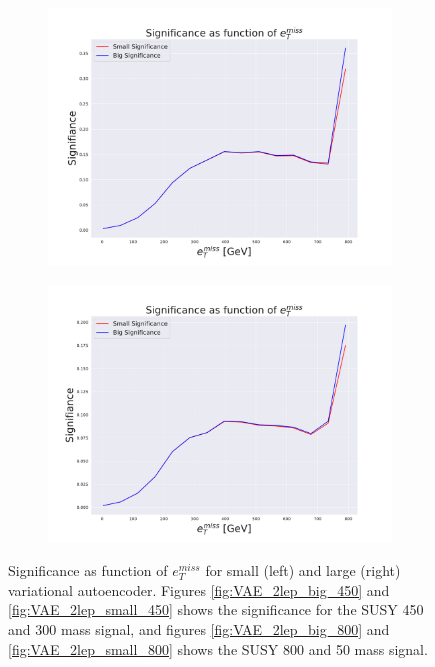 \begin{figure}[H]
\begin{subfigure}{.45\textwidth}
        \includegraphics[width=\textwidth]{Figures/VAE_testing/big/2lep/significance_etmiss_800p0p050.pdf}
        \caption{}
        \label{fig:VAE_2lep_big_800_signi}
    \end{subfigure}
    \hfill   
    \begin{subfigure}{.45\textwidth}
        \includegraphics[width=\textwidth]{Figures/VAE_testing/small/2lep/significance_etmiss_800p0p050.pdf}
        \caption{}
        \label{fig:VAE_2lep_small_800_signi}
    \end{subfigure}
    \hfill      
    \caption[VAE | Significance as function of $e_T^{miss}$]{Significance as function of $e_T^{miss}$ for small (left) and large (right) 
    variational autoencoder. Figures \ref{fig:VAE_2lep_big_450} and \ref{fig:VAE_2lep_small_450} shows the significance for the SUSY 450 
    and 300 mass signal, and figures \ref{fig:VAE_2lep_big_800} and \ref{fig:VAE_2lep_small_800} shows the SUSY 800 and 50 mass signal.}
    \label{fig:VAE_2lep_recon_err_both_sig_signi}
\end{figure}

